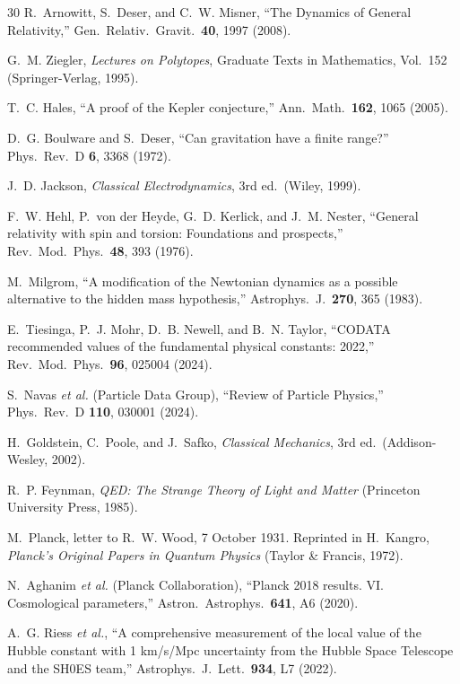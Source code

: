 \documentclass[aps,prd,preprint,superscriptaddress,showpacs,preprintnumbers,amsmath,amssymb,nofootinbib]{revtex4-2}
\begin{document}
\begin{thebibliography}{30}
R.~Arnowitt, S.~Deser, and C.~W. Misner, ``The Dynamics of General Relativity,'' Gen.\ Relativ.\ Gravit.\ \textbf{40}, 1997 (2008).

G.~M. Ziegler, \emph{Lectures on Polytopes}, Graduate Texts in Mathematics, Vol.~152 (Springer-Verlag, 1995).

T.~C. Hales, ``A proof of the Kepler conjecture,'' Ann.\ Math.\ \textbf{162}, 1065 (2005).

D.~G. Boulware and S.~Deser, ``Can gravitation have a finite range?'' Phys.\ Rev.\ D \textbf{6}, 3368 (1972).

J.~D. Jackson, \emph{Classical Electrodynamics}, 3rd ed.\ (Wiley, 1999).

F.~W. Hehl, P.~von der Heyde, G.~D. Kerlick, and J.~M. Nester, ``General relativity with spin and torsion: Foundations and prospects,'' Rev.\ Mod.\ Phys.\ \textbf{48}, 393 (1976).

M.~Milgrom, ``A modification of the Newtonian dynamics as a possible alternative to the hidden mass hypothesis,'' Astrophys.\ J.\ \textbf{270}, 365 (1983).

E.~Tiesinga, P.~J. Mohr, D.~B. Newell, and B.~N. Taylor, ``CODATA recommended values of the fundamental physical constants: 2022,'' Rev.\ Mod.\ Phys.\ \textbf{96}, 025004 (2024).

S.~Navas \textit{et al.} (Particle Data Group), ``Review of Particle Physics,'' Phys.\ Rev.\ D \textbf{110}, 030001 (2024).

H.~Goldstein, C.~Poole, and J.~Safko, \emph{Classical Mechanics}, 3rd ed.\ (Addison-Wesley, 2002).

R.~P. Feynman, \emph{QED: The Strange Theory of Light and Matter} (Princeton University Press, 1985).

M.~Planck, letter to R.~W. Wood, 7 October 1931. Reprinted in H.~Kangro, \emph{Planck's Original Papers in Quantum Physics} (Taylor \& Francis, 1972).

N.~Aghanim \textit{et al.} (Planck Collaboration), ``Planck 2018 results. VI. Cosmological parameters,'' Astron.\ Astrophys.\ \textbf{641}, A6 (2020).

A.~G. Riess \textit{et al.}, ``A comprehensive measurement of the local value of the Hubble constant with 1 km/s/Mpc uncertainty from the Hubble Space Telescope and the SH0ES team,'' Astrophys.\ J.\ Lett.\ \textbf{934}, L7 (2022).


\end{thebibliography}
\end{document}
